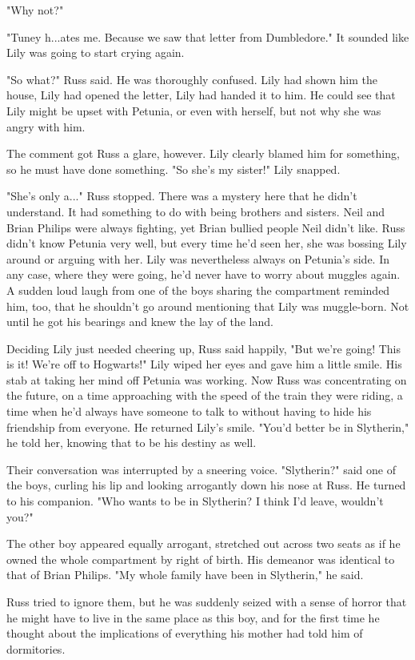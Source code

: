 \documentclass[a4paper,11pt]{article}
\begin{document}
"Why not?"

"Tuney h...ates me. Because we saw that letter from Dumbledore." It sounded like Lily was going to start crying again.

"So what?" Russ said. He was thoroughly confused. Lily had shown him the house, Lily had opened the letter, Lily had handed it to him. He could see that Lily might be upset with Petunia, or even with herself, but not why she was angry with him.

The comment got Russ a glare, however. Lily clearly blamed him for something, so he must have done something. "So she's my sister!" Lily snapped.

"She's only a..." Russ stopped. There was a mystery here that he didn't understand. It had something to do with being brothers and sisters. Neil and Brian Philips were always fighting, yet Brian bullied people Neil didn't like. Russ didn't know Petunia very well, but every time he'd seen her, she was bossing Lily around or arguing with her. Lily was nevertheless always on Petunia's side. In any case, where they were going, he'd never have to worry about muggles again. A sudden loud laugh from one of the boys sharing the compartment reminded him, too, that he shouldn't go around mentioning that Lily was muggle-born. Not until he got his bearings and knew the lay of the land.

Deciding Lily just needed cheering up, Russ said happily, "But we're going! This is it! We're off to Hogwarts!" Lily wiped her eyes and gave him a little smile. His stab at taking her mind off Petunia was working. Now Russ was concentrating on the future, on a time approaching with the speed of the train they were riding, a time when he'd always have someone to talk to without having to hide his friendship from everyone. He returned Lily's smile. "You'd better be in Slytherin," he told her, knowing that to be his destiny as well.

Their conversation was interrupted by a sneering voice. "Slytherin?" said one of the boys, curling his lip and looking arrogantly down his nose at Russ. He turned to his companion. "Who wants to be in Slytherin? I think I'd leave, wouldn't you?"

The other boy appeared equally arrogant, stretched out across two seats as if he owned the whole compartment by right of birth. His demeanor was identical to that of Brian Philips. "My whole family have been in Slytherin," he said.

Russ tried to ignore them, but he was suddenly seized with a sense of horror that he might have to live in the same place as this boy, and for the first time he thought about the implications of everything his mother had told him of dormitories.
\end{document}
